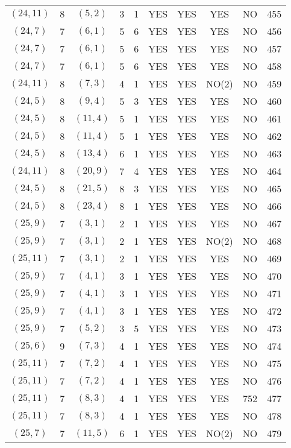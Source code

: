\begin{longtable}{|c|c|c|c|c|c|c|c|c|c|}
$(24, 11)$ & 8 & $(5, 2)$ & 3 & 1 & YES & YES & YES & NO & 455\\
$(24, 7)$ & 7 & $(6, 1)$ & 5 & 6 & YES & YES & YES & NO & 456\\
$(24, 7)$ & 7 & $(6, 1)$ & 5 & 6 & YES & YES & YES & NO & 457\\
$(24, 7)$ & 7 & $(6, 1)$ & 5 & 6 & YES & YES & YES & NO & 458\\
$(24, 11)$ & 8 & $(7, 3)$ & 4 & 1 & YES & YES & NO(2) & NO & 459\\
$(24, 5)$ & 8 & $(9, 4)$ & 5 & 3 & YES & YES & YES & NO & 460\\
$(24, 5)$ & 8 & $(11, 4)$ & 5 & 1 & YES & YES & YES & NO & 461\\
$(24, 5)$ & 8 & $(11, 4)$ & 5 & 1 & YES & YES & YES & NO & 462\\
$(24, 5)$ & 8 & $(13, 4)$ & 6 & 1 & YES & YES & YES & NO & 463\\
$(24, 11)$ & 8 & $(20, 9)$ & 7 & 4 & YES & YES & YES & NO & 464\\
$(24, 5)$ & 8 & $(21, 5)$ & 8 & 3 & YES & YES & YES & NO & 465\\
$(24, 5)$ & 8 & $(23, 4)$ & 8 & 1 & YES & YES & YES & NO & 466\\
$(25, 9)$ & 7 & $(3, 1)$ & 2 & 1 & YES & YES & YES & NO & 467\\
$(25, 9)$ & 7 & $(3, 1)$ & 2 & 1 & YES & YES & NO(2) & NO & 468\\
$(25, 11)$ & 7 & $(3, 1)$ & 2 & 1 & YES & YES & YES & NO & 469\\
$(25, 9)$ & 7 & $(4, 1)$ & 3 & 1 & YES & YES & YES & NO & 470\\
$(25, 9)$ & 7 & $(4, 1)$ & 3 & 1 & YES & YES & YES & NO & 471\\
$(25, 9)$ & 7 & $(4, 1)$ & 3 & 1 & YES & YES & YES & NO & 472\\
$(25, 9)$ & 7 & $(5, 2)$ & 3 & 5 & YES & YES & YES & NO & 473\\
$(25, 6)$ & 9 & $(7, 3)$ & 4 & 1 & YES & YES & YES & NO & 474\\
$(25, 11)$ & 7 & $(7, 2)$ & 4 & 1 & YES & YES & YES & NO & 475\\
$(25, 11)$ & 7 & $(7, 2)$ & 4 & 1 & YES & YES & YES & NO & 476\\
$(25, 11)$ & 7 & $(8, 3)$ & 4 & 1 & YES & YES & YES & 752 & 477\\
$(25, 11)$ & 7 & $(8, 3)$ & 4 & 1 & YES & YES & YES & NO & 478\\
$(25, 7)$ & 7 & $(11, 5)$ & 6 & 1 & YES & YES & NO(2) & NO & 479\\

\end{longtable}
